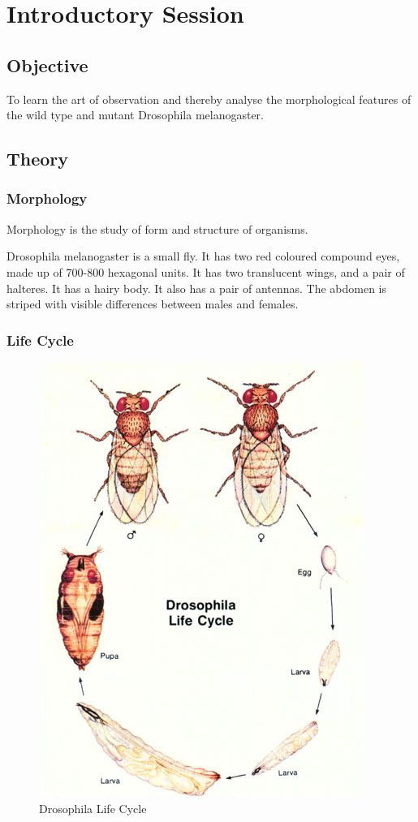 \chapter{Introductory Session}\label{ch:introduction}
\section{Objective}
To learn the art of observation and thereby analyse the morphological features of the wild type and mutant Drosophila melanogaster.

\section{Theory}
	\subsection{Morphology}
		Morphology is the study of form and structure of organisms.
		\par	
		Drosophila melanogaster is a small fly. It has two red coloured compound eyes, made up of 700-800 hexagonal units. It has two translucent wings, and a pair of halteres. It has a hairy body. It also has a pair of antennas. The abdomen is striped with visible differences between males and females.
	\subsection{Life Cycle}
		\begin{figure}[h]
			\begin{center}
				\includegraphics[width=.5\linewidth]{gfx/drosophila}
			\end{center}
		\caption[Drosophila Life Cycle]{Drosophila Life Cycle \citep{drosophila:lifecycle}}
		\end{figure}

